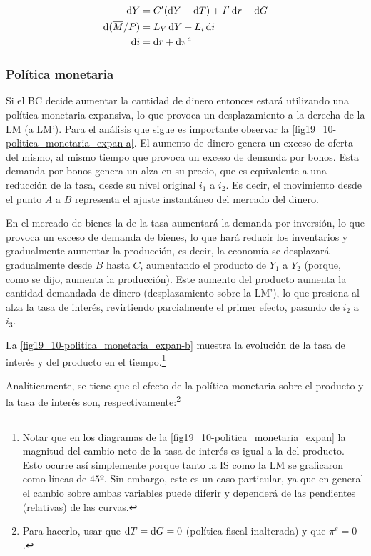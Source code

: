 \documentclass[DeGregorioResumen]{subfiles}
\begin{document}
\begin{align}
\diff Y &= C'(\diff Y-\diff T)+I'\diff r+\diff G \\
\diff (\overline M/P) &= L_Y \diff Y + L_i\diff i \\
\diff i &= \diff r + \diff \pi^e 
\end{align}

\subsubsection{Política monetaria}

Si el BC decide aumentar la cantidad de dinero entonces estará utilizando una política monetaria expansiva, lo que provoca un desplazamiento a la derecha de la LM (a LM'). Para el análisis que sigue es importante observar la \autoref{fig19_10-politica_monetaria_expan-a}. El aumento de dinero genera un exceso de oferta del mismo, al mismo tiempo que provoca un exceso de demanda por bonos. Esta demanda por bonos genera un alza en su precio, que es equivalente a una reducción de la tasa, desde su nivel original $i_1$ a $i_2$. Es decir, el movimiento desde el punto $A$ a $B$ representa el ajuste instantáneo del mercado del dinero.



En el mercado de bienes la  de la tasa aumentará la demanda por inversión, lo que provoca un exceso de demanda de bienes, lo que hará reducir los inventarios y gradualmente aumentar la producción, es decir, la economía se desplazará gradualmente desde $B$ hasta $C$, aumentando el producto de $Y_1$ a $Y_2$ (porque, como se dijo, aumenta la producción). Este aumento del producto aumenta la cantidad demandada de dinero (desplazamiento sobre la LM'), lo que presiona al alza la tasa de interés, revirtiendo parcialmente el primer efecto, pasando de $i_2$ a $i_3$.

La \autoref{fig19_10-politica_monetaria_expan-b} muestra la evolución de la tasa de interés y del producto en el tiempo.\footnote{Notar que en los diagramas de la \autoref{fig19_10-politica_monetaria_expan} la magnitud del cambio neto de la tasa de interés es igual a la del producto. Esto ocurre así simplemente porque tanto la IS como la LM se graficaron como líneas de $45º$. Sin embargo, este es un caso particular, ya que en general el cambio sobre ambas variables puede diferir y dependerá de las pendientes (relativas) de las curvas.}

Analíticamente, se tiene que el efecto de la política monetaria sobre el producto y la tasa de interés son, respectivamente:\footnote{Para hacerlo, usar que $\mathop{}\!\mathrm{d} T = \mathop{}\!\mathrm{d} G = 0$ (política fiscal inalterada) y que $\pi^e=0$.}
\end{document}
